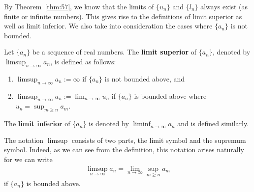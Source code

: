 \documentclass[thmcnt=section, 12pt]{my-elegantbook}
\begin{document}
By Theorem~\ref{thm:57}, we know that the limits of $\{u_n\}$ and $\{l_n\}$ always exist (as finite or infinite numbers). This gives rise to the definitions of limit superior as well as limit inferior. We also take into consideration the cases where $\{a_n\}$ is not bounded.

\begin{definition}
    Let $\{a_n\}$ be a sequence of real numbers. The \textbf{limit superior} of $\{a_n\}$, denoted by $\limsup_{n \to \infty} a_n$, is defined as follows:
    \begin{enumerate}
        \item $\limsup_{n \to \infty} a_n := \infty$ if $\{a_n\}$ is not bounded above, and
        \item $\limsup_{n \to \infty} a_n := \lim_{n \to \infty} u_n$ if $\{a_n\}$ is bounded above where $u_n = \sup_{m \geq n} a_m$.
    \end{enumerate}
    The \textbf{limit inferior} of $\{a_n\}$ is denoted by $\liminf_{n \to \infty} a_n$ and is defined similarly.
\end{definition}

\begin{note}
    The notation $\limsup$ consists of two parts, the limit symbol and the supremum symbol. Indeed, as we can see from the definition, this notation arises naturally for we can write
    \begin{align*}
        \limsup_{n \to \infty} a_n
        = \lim_{n \to \infty} \sup_{m \geq n} a_m
    \end{align*}
    if $\{a_n\}$ is bounded above.
\end{note}
\end{document}
